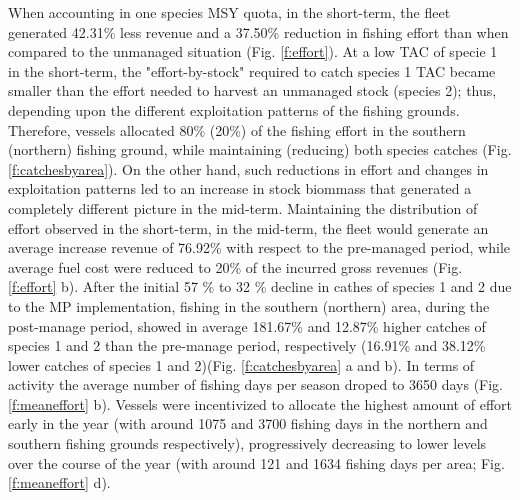 \documentclass[12pt,oneline,a4paper,numbib]{ouparticle}
\numberwithin{equation}{subsection} %
\begin{document}
When accounting in one species MSY quota, in the short-term, the fleet generated 42.31\% less revenue and a 37.50\% reduction in fishing effort than when compared to the unmanaged situation (Fig. \ref{f:effort}). At a low TAC of specie 1 in the short-term, the "effort-by-stock" required to catch species 1 TAC became smaller than the effort needed to harvest an unmanaged stock (species 2); thus, depending upon the different exploitation patterns of the fishing grounds. Therefore, vessels allocated 80\% (20\%) of the fishing effort in the southern (northern) fishing ground, while maintaining (reducing) both species catches (Fig. \ref{f:catchesbyarea}). On the other hand, such reductions in effort and changes in exploitation patterns led to an increase in stock biommass that generated a completely different picture in the mid-term. Maintaining the distribution of effort observed in the short-term, in the mid-term, the fleet would generate an average increase revenue of 76.92\% with respect to the pre-managed period, while average fuel cost were reduced to 20\% of the incurred gross revenues (Fig. \ref{f:effort} b). After the initial 57 \% to 32 \% decline in cathes of species 1 and 2 due to the MP implementation, fishing in the southern (northern) area, during the post-manage period, showed in average 181.67\% and 12.87\% higher catches of species 1 and 2 than the pre-manage period, respectively (16.91\% and 38.12\% lower catches of species 1 and 2)(Fig. \ref{f:catchesbyarea} a and b). In terms of activity the average number of fishing days per season droped to 3650 days (Fig. \ref{f:meaneffort} b). Vessels were incentivized to allocate the highest amount of effort early in the year (with around 1075 and 3700 fishing days in the northern and southern fishing grounds respectively), progressively decreasing to lower levels over the course of the year (with around 121 and 1634 fishing days per area; Fig. \ref{f:meaneffort} d).
\end{document}
